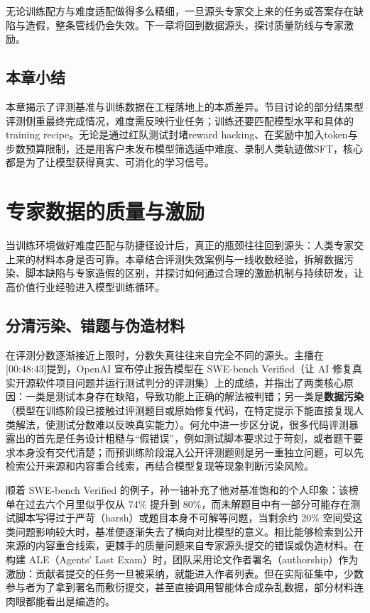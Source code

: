 \documentclass[UTF8,a4paper,11pt,fontset=fandol]{ctexart}
\begin{document}
无论训练配方与难度适配做得多么精细，一旦源头专家交上来的任务或答案存在缺陷与造假，整条管线仍会失效。下一章将回到数据源头，探讨质量防线与专家激励。
\subsection{本章小结}
本章揭示了评测基准与训练数据在工程落地上的本质差异。节目讨论的部分结果型评测侧重最终完成情况，难度需反映行业任务；训练还要匹配模型水平和具体的 training recipe。无论是通过红队测试封堵reward hacking、在奖励中加入token与步数预算限制，还是用客户未发布模型筛选适中难度、录制人类轨迹做SFT，核心都是为了让模型获得真实、可消化的学习信号。
\section{专家数据的质量与激励}
当训练环境做好难度匹配与防捷径设计后，真正的瓶颈往往回到源头：人类专家交上来的材料本身是否可靠。本章结合评测失效案例与一线收数经验，拆解数据污染、脚本缺陷与专家造假的区别，并探讨如何通过合理的激励机制与持续研发，让高价值行业经验进入模型训练循环。
\subsection{分清污染、错题与伪造材料}
在评测分数逐渐接近上限时，分数失真往往来自完全不同的源头。主播在[00:48:43]提到，OpenAI 宣布停止报告模型在 SWE-bench Verified（让 AI 修复真实开源软件项目问题并运行测试判分的评测集）上的成绩，并指出了两类核心原因：一类是测试本身存在缺陷，导致功能上正确的解法被判错；另一类是\textbf{数据污染}（模型在训练阶段已接触过评测题目或原始修复代码，在特定提示下能直接复现人类解法，使测试分数难以反映真实能力）。何允中进一步区分说，很多代码评测暴露出的首先是任务设计粗糙与“假错误”，例如测试脚本要求过于苛刻，或者题干要求本身没有交代清楚；而预训练阶段混入公开评测题则是另一重独立问题，可以先检索公开来源和内容重合线索，再结合模型复现等现象判断污染风险。

顺着 SWE-bench Verified 的例子，孙一铀补充了他对基准饱和的个人印象：该榜单在过去六个月里似乎仅从 74\% 提升到 80\%，而未解题目中有一部分可能存在测试脚本写得过于严苛（harsh）或题目本身不可解等问题，当剩余约 20\% 空间受这类问题影响较大时，基准便逐渐失去了横向对比模型的意义。相比能够检索到公开来源的内容重合线索，更棘手的质量问题来自专家源头提交的错误或伪造材料。在构建 ALE（Agents' Last Exam）时，团队采用论文作者署名（authorship）作为激励：贡献者提交的任务一旦被采纳，就能进入作者列表。但在实际征集中，少数参与者为了拿到署名而敷衍提交，甚至直接调用智能体合成杂乱数据，部分材料连肉眼都能看出是编造的。
\end{document}
